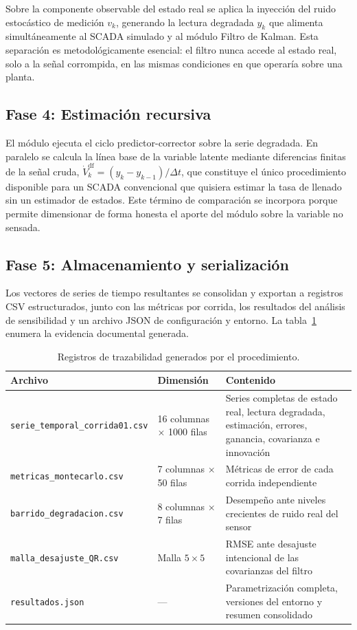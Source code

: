 Sobre la componente observable del estado real se aplica la inyección del ruido
estocástico de medición $v_{k}$, generando la lectura degradada $y_{k}$ que
alimenta simultáneamente al SCADA simulado y al módulo Filtro de Kalman. Esta
separación es metodológicamente esencial: el filtro nunca accede al estado real,
solo a la señal corrompida, en las mismas condiciones en que operaría sobre una
planta.

\subsection{Fase 4: Estimación recursiva}

El módulo ejecuta el ciclo predictor-corrector sobre la serie degradada. En
paralelo se calcula la línea base de la variable latente mediante diferencias
finitas de la señal cruda,
$\dot{V}^{\text{df}}_{k} = (y_{k} - y_{k-1})/\Delta t$, que constituye el único
procedimiento disponible para un SCADA convencional que quisiera estimar la tasa
de llenado sin un estimador de estados. Este término de comparación se incorpora
porque permite dimensionar de forma honesta el aporte del módulo sobre la
variable no sensada.

\subsection{Fase 5: Almacenamiento y serialización}

Los vectores de series de tiempo resultantes se consolidan y exportan a
registros CSV estructurados, junto con las métricas por corrida, los resultados
del análisis de sensibilidad y un archivo JSON de configuración y entorno. La
tabla~\ref{tab:evidencia} enumera la evidencia documental generada.

\begin{table}[H]
\centering
\caption{Registros de trazabilidad generados por el procedimiento.}
\label{tab:evidencia}
\footnotesize
\begin{tabular}{@{}p{5.0cm}p{3.0cm}p{5.4cm}@{}}
\toprule
\textbf{Archivo} & \textbf{Dimensión} & \textbf{Contenido}\\
\midrule
\texttt{serie\_temporal\_corrida01.csv} & 16 columnas $\times$ 1000 filas &
Series completas de estado real, lectura degradada, estimación, errores,
ganancia, covarianza e innovación\\
\addlinespace
\texttt{metricas\_montecarlo.csv} & 7 columnas $\times$ 50 filas &
Métricas de error de cada corrida independiente\\
\addlinespace
\texttt{barrido\_degradacion.csv} & 8 columnas $\times$ 7 filas &
Desempeño ante niveles crecientes de ruido real del sensor\\
\addlinespace
\texttt{malla\_desajuste\_QR.csv} & Malla $5\times5$ &
RMSE ante desajuste intencional de las covarianzas del filtro\\
\addlinespace
\texttt{resultados.json} & --- &
Parametrización completa, versiones del entorno y resumen consolidado\\
\bottomrule
\end{tabular}
\end{table}

